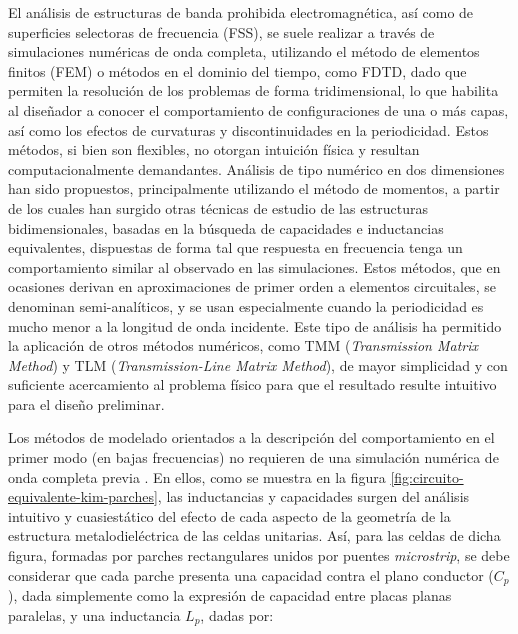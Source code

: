 


El análisis de estructuras de banda prohibida electromagnética, así como de superficies selectoras de frecuencia (FSS), se suele realizar a través de simulaciones numéricas de onda completa, utilizando el método de elementos finitos (FEM) o métodos en el dominio del tiempo, como FDTD, dado que permiten la resolución de los problemas de forma tridimensional, lo que habilita al diseñador a conocer el comportamiento de configuraciones de una o más capas, así como los efectos de curvaturas y discontinuidades en la periodicidad. Estos métodos, si bien son flexibles, no otorgan intuición física y resultan computacionalmente demandantes. Análisis de tipo numérico en dos dimensiones han sido propuestos, principalmente utilizando el método de momentos, a partir de los cuales han surgido otras técnicas de estudio de las estructuras bidimensionales, basadas en la búsqueda de capacidades e inductancias equivalentes, dispuestas de forma tal que respuesta en frecuencia tenga un comportamiento similar al observado en las simulaciones. Estos métodos, que en ocasiones derivan en aproximaciones de primer orden a elementos circuitales, se denominan semi-analíticos, y se usan especialmente cuando la periodicidad es mucho menor a la longitud de onda incidente. Este tipo de análisis ha permitido la aplicación de otros métodos numéricos, como TMM (\textit{Transmission Matrix Method}) y TLM (\textit{Transmission-Line Matrix Method}), de mayor simplicidad y con suficiente acercamiento al problema físico para que el resultado resulte intuitivo para el diseño preliminar.

Los métodos de modelado orientados a la descripción del comportamiento en el primer modo (en bajas frecuencias) no requieren de una simulación numérica de onda completa previa \cite{KimSchuttAine:AnalysisHybrid}. En ellos, como se muestra en la figura \ref{fig:circuito-equivalente-kim-parches}, las inductancias y capacidades surgen del análisis intuitivo y cuasiestático del efecto de cada aspecto de la geometría de la estructura metalodieléctrica de las celdas unitarias. Así, para las celdas de dicha figura, formadas por parches rectangulares unidos por puentes \textit{microstrip}, se debe considerar que cada parche presenta una capacidad contra el plano conductor ($C_p$), dada simplemente como la expresión de capacidad entre placas planas paralelas, y una inductancia $L_p$, dadas por:

